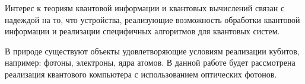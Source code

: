 Интерес к теориям квантовой информации и квантовых вычислений связан с надеждой
на то, что устройства, реализующие возможность обработки квантовой информации и
реализации специфичных алгоритмов для квантовых систем.

В природе существуют объекты удовлетворяющие условиям реализации кубитов,
например: фотоны, электроны, ядра атомов. В данной работе будет рассмотрена
реализация квантового компьютера с использованием оптических фотонов.
